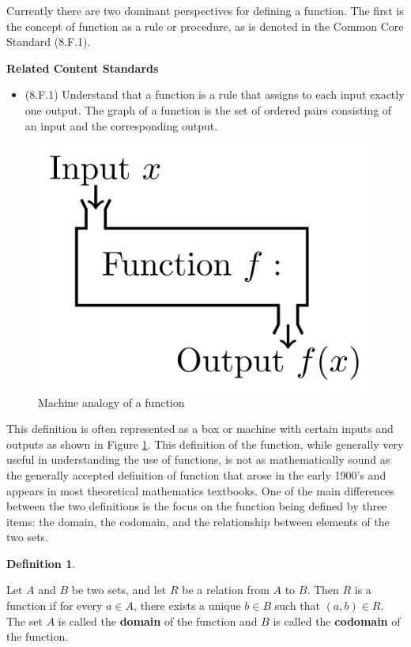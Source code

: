 \documentclass[
]{book}
\providecommand{\tightlist}{%
  \setlength{\itemsep}{0pt}\setlength{\parskip}{0pt}}
\newenvironment{standards}{}{}
\theoremstyle{definition}
\newtheorem{definition}{Definition}[chapter]
\theoremstyle{definition}
\theoremstyle{definition}
\theoremstyle{definition}
\theoremstyle{remark}
\begin{document}
Currently there are two dominant perspectives for defining a function. The first is the concept of function as a rule or procedure, as is denoted in the Common Core Standard (8.F.1).

\begin{standards}

\begin{center}
\textbf{Related Content Standards}

\end{center}

\begin{itemize}
\tightlist
\item
  (8.F.1) Understand that a function is a rule that assigns to each input exactly one output. The graph of a function is the set of ordered pairs consisting of an input and the corresponding output.
\end{itemize}

\end{standards}

\begin{figure}

{\centering \includegraphics[width=0.4\linewidth]{tikz/function-machine} 

}

\caption{Machine analogy of a function}\label{fig:machine}
\end{figure}

This definition is often represented as a box or machine with certain inputs and outputs as shown in Figure \ref{fig:machine}. This definition of the function, while generally very useful in understanding the use of functions, is not as mathematically sound as the generally accepted definition of function that arose in the early 1900's and appears in most theoretical mathematics textbooks. One of the main differences between the two definitions is the focus on the function being defined by three items: the domain, the codomain, and the relationship between elements of the two sets.

\begin{definition}
\protect\hypertarget{def:unlabeled-div-61}{}\label{def:unlabeled-div-61}

Let \(A\) and \(B\) be two sets, and let \(R\) be a relation from \(A\) to \(B\). Then \(R\) is a function if for every \(a\in A\), there exists a unique \(b\in B\) such that \((a,b)\in R\). The set \(A\) is called the \textbf{domain} of the function and \(B\) is called the \textbf{codomain} of the function.

\end{definition}
\end{document}
